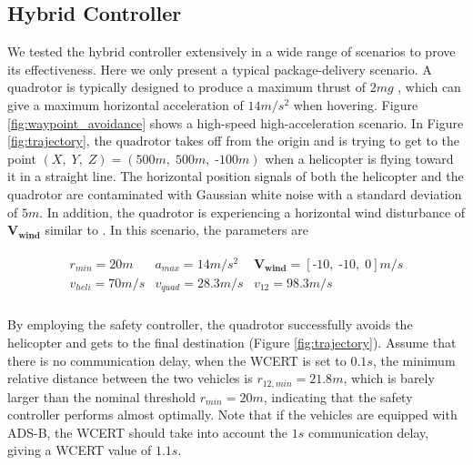 \documentclass[journal,11pt,onecolumn,draftclsnofoot,]{IEEEtran}
\begin{document}
\subsection{Hybrid Controller}

We tested the hybrid controller extensively in a wide range of scenarios to prove its effectiveness. Here we only present a typical package-delivery scenario. A quadrotor is typically designed to produce a maximum thrust of $2mg$ \cite{quad_design}, which can give a maximum horizontal acceleration of $14m/s^2$ when hovering. Figure \ref{fig:waypoint_avoidance} shows a high-speed high-acceleration scenario. In Figure \ref{fig:trajectory}, the quadrotor takes off from the origin and is trying to get to the point $(X,\;Y, \; Z)=(500m, \; 500m, \; \text{-}100m)$ when a helicopter is flying toward it in a straight line. The horizontal position signals of both the helicopter and the quadrotor are contaminated with Gaussian white noise with a standard deviation of $5m$. In addition, the quadrotor is experiencing a horizontal wind disturbance of $\boldsymbol{V_{wind}}$ similar to \cite{madani2006backstepping_2}. In this scenario, the parameters are

\begin{equation*}
\label{eq:hybrid_param}
\begin{split}
\begin{matrix}
r_{min} = 20 m &
a_{max} = 14 m/s^2 &
\boldsymbol{V_{wind}}=[\text{-}10, \; \text{-}10,\; 0]m/s\\
v_{heli} = 70 m/s &
v_{quad} = 28.3 m/s &
v_{12} = 98.3 m/s \\
\end{matrix}
\end{split}
\end{equation*}

By employing the safety controller, the quadrotor successfully avoids the helicopter and gets to the final destination (Figure \ref{fig:trajectory}). Assume that there is no communication delay, when the WCERT is set to $0.1s$, the minimum relative distance between the two vehicles is $r_{12,min}=21.8m$, which is barely larger than the nominal threshold $r_{min}=20m$, indicating that the safety controller performs almost optimally. Note that if the vehicles are equipped with ADS-B, the WCERT should take into account the $1s$ communication delay, giving a WCERT value of $1.1s$.
\end{document}
